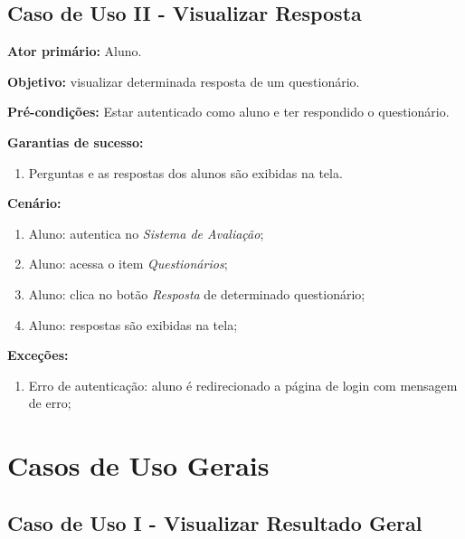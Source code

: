 \documentclass[
  12pt,       %
  openright,      %
  oneside,      %
  a4paper,      %
  english,      %
  french,        %
  spanish,     %
  brazil        %
  ]{abntex2-decsi}
\begin{document}
\begin{apendicesenv}
	\newpage
    
    \section{Caso de Uso II - Visualizar Resposta}
    
	\textbf{Ator primário:} Aluno.
				
    \textbf{Objetivo:} visualizar determinada resposta de um questionário.
    
	\textbf{Pré-condições:} Estar autenticado como aluno e ter respondido o questionário.
		
	\textbf{Garantias de sucesso:} 
        
            \begin{enumerate}
            
            \item Perguntas e as respostas dos alunos são exibidas na tela.  
            
            \end{enumerate}
        
		\textbf{Cenário:}
		
		\begin{enumerate}
			\item Aluno: autentica no \textit{Sistema de Avaliação};           
			\item Aluno: acessa o item \textit{Questionários};
            \item Aluno: clica no botão \textit{Resposta} de determinado questionário;
			\item Aluno: respostas são exibidas na tela;
		\end{enumerate}
		
		\textbf{Exceções:}
		
			\begin{enumerate}	
				\item Erro de autenticação: aluno é redirecionado a página de login com mensagem de erro;
			\end{enumerate}

	\newpage

\chapter{Casos de Uso Gerais}

\section{Caso de Uso I - Visualizar Resultado Geral}
    

\end{apendicesenv}
\end{document}
